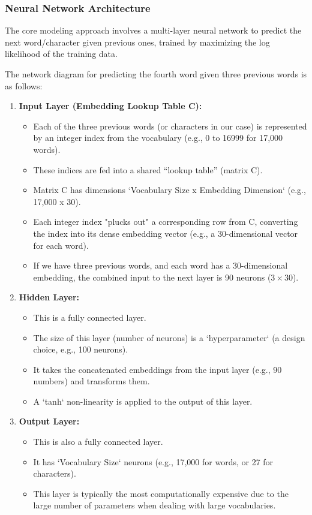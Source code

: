 \subsubsection{Neural Network Architecture}
The core modeling approach involves a multi-layer neural network to predict the next word/character given previous ones, trained by maximizing the log likelihood of the training data.

The network diagram for predicting the fourth word given three previous words is as follows:
\begin{enumerate}
    \item \textbf{Input Layer (Embedding Lookup Table C):}
    \begin{itemize}
        \item Each of the three previous words (or characters in our case) is represented by an integer index from the vocabulary (e.g., 0 to 16999 for 17,000 words).
        \item These indices are fed into a shared ``lookup table'' (matrix C).
        \item Matrix C has dimensions `Vocabulary Size x Embedding Dimension` (e.g., 17,000 x 30).
        \item Each integer index "plucks out" a corresponding row from C, converting the index into its dense embedding vector (e.g., a 30-dimensional vector for each word).
        \item If we have three previous words, and each word has a 30-dimensional embedding, the combined input to the next layer is 90 neurons ($3 \times 30$).
    \end{itemize}

    \item \textbf{Hidden Layer:}
    \begin{itemize}
        \item This is a fully connected layer.
        \item The size of this layer (number of neurons) is a `hyperparameter` (a design choice, e.g., 100 neurons).
        \item It takes the concatenated embeddings from the input layer (e.g., 90 numbers) and transforms them.
        \item A `tanh` non-linearity is applied to the output of this layer.
    \end{itemize}

    \item \textbf{Output Layer:}
    \begin{itemize}
        \item This is also a fully connected layer.
        \item It has `Vocabulary Size` neurons (e.g., 17,000 for words, or 27 for characters).
        \item This layer is typically the most computationally expensive due to the large number of parameters when dealing with large vocabularies.
    \end{itemize}


\end{enumerate}

